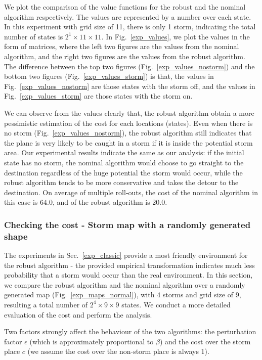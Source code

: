 \documentclass[11pt,reqno]{amsart}
\theoremstyle{definition}
\numberwithin{equation}{section}
\theoremstyle{remark}
\begin{document}
We plot the comparison of the value functions for the robust and the nominal algorithm respectively. The values are represented by a number over each state. In this experiment with grid size of 11, there is only 1 storm, indicating the total number of states is $2^1 \times 11 \times 11$. In Fig.~\ref{exp_values}, we plot the values in the form of matrices, where the left two figures are the values from the nominal algorithm, and the right two figures are the values from the robust algorithm. The difference between the top two figures (Fig.~\ref{exp_values_nostorm}) and the bottom two figures (Fig.~\ref{exp_values_storm}) is that, the values in Fig.~\ref{exp_values_nostorm} are those states with the storm off, and the values in Fig.~\ref{exp_values_storm} are those states with the storm on. 

We can observe from the values clearly that, the robust algorithm obtain a more pessimistic estimation of the cost for each locations (states). Even when there is no storm (Fig.~\ref{exp_values_nostorm}), the robust algorithm still indicates that the plane is very likely to be caught in a storm if it is inside the potential storm area. Our experimental results indicate the same as our analysis: if the initial state has no storm, the nominal algorithm would choose to go straight to the destination regardless of the huge potential the storm would occur, while the robust algorithm tends to be more conservative and takes the detour to the destination. On average of multiple roll-outs, the cost of the nominal algorithm in this case is $64.0$, and of the robust algorithm is $20.0$.

\subsubsection{Checking the cost - Storm map with a randomly generated shape}
\label{exp_normal}

The experiments in Sec.~\ref{exp_classic} provide a most friendly environment for the robust algorithm - the provided empirical transformation indicates much less probability that a storm would occur than the real environment. In this section, we compare the robust algorithm and the nominal algorithm over a randomly generated map (Fig.~\ref{exp_maps_normal}), with $4$ storms and grid size of $9$, resulting a total number of $2^4 \times 9 \times 9$ states. We conduct a more detailed evaluation of the cost and perform the analysis.

\medskip

Two factors strongly affect the behaviour of the two algorithms: the perturbation factor $\epsilon$ (which is approximately proportional to $\beta$) and the cost over the storm place $c$ (we assume the cost over the non-storm place is always 1). 
\end{document}
